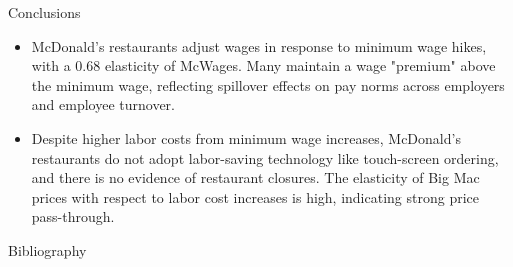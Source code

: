 \documentclass[12pt]{beamer}
\begin{document}
\begin{frame}[allowframebreaks]{Conclusions}
	\begin{itemize}
		\item  McDonald's restaurants adjust wages in response to minimum wage hikes, with a 0.68 elasticity of McWages. Many maintain a wage "premium" above the minimum wage, reflecting spillover effects on pay norms across employers and employee turnover.
		\item Despite higher labor costs from minimum wage increases, McDonald's restaurants do not adopt labor-saving technology like touch-screen ordering, and there is no evidence of restaurant closures. The elasticity of Big Mac prices with respect to labor cost increases is high, indicating strong price pass-through.
	\end{itemize}
\end{frame}
\begin{frame}[allowframebreaks]{Bibliography}
	\printbibliography
\end{frame}
\end{document}
